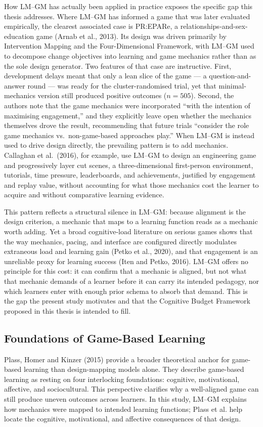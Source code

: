\documentclass[12pt]{report}
\begin{document}
How LM--GM has actually been applied in practice exposes the specific gap this thesis addresses. Where LM--GM has informed a game that was later evaluated empirically, the clearest associated case is PR:EPARe, a relationships-and-sex-education game (Arnab et al., 2013). Its design was driven primarily by Intervention Mapping and the Four-Dimensional Framework, with LM--GM used to decompose change objectives into learning and game mechanics rather than as the sole design generator. Two features of that case are instructive. First, development delays meant that only a lean slice of the game --- a question-and-answer round --- was ready for the cluster-randomised trial, yet that minimal-mechanics version still produced positive outcomes ($n = 505$). Second, the authors note that the game mechanics were incorporated ``with the intention of maximising engagement,'' and they explicitly leave open whether the mechanics themselves drove the result, recommending that future trials ``consider the role game mechanics vs.\ non-game-based approaches play.'' When LM--GM is instead used to drive design directly, the prevailing pattern is to add mechanics. Callaghan et al.\ (2016), for example, use LM--GM to design an engineering game and progressively layer cut scenes, a three-dimensional first-person environment, tutorials, time pressure, leaderboards, and achievements, justified by engagement and replay value, without accounting for what those mechanics cost the learner to acquire and without comparative learning evidence.

This pattern reflects a structural silence in LM--GM: because alignment is the design criterion, a mechanic that maps to a learning function reads as a mechanic worth adding. Yet a broad cognitive-load literature on serious games shows that the way mechanics, pacing, and interface are configured directly modulates extraneous load and learning gain (Petko et al., 2020), and that engagement is an unreliable proxy for learning success (Iten and Petko, 2016). LM--GM offers no principle for this cost: it can confirm that a mechanic is aligned, but not what that mechanic demands of a learner before it can carry its intended pedagogy, nor which learners enter with enough prior schema to absorb that demand. This is the gap the present study motivates and that the Cognitive Budget Framework proposed in this thesis is intended to fill.

\subsection{Foundations of Game-Based Learning}
Plass, Homer and Kinzer (2015) provide a broader theoretical anchor for game-based learning than design-mapping models alone. They describe game-based learning as resting on four interlocking foundations: cognitive, motivational, affective, and sociocultural. This perspective clarifies why a well-aligned game can still produce uneven outcomes across learners. In this study, LM--GM explains how mechanics were mapped to intended learning functions; Plass et al. help locate the cognitive, motivational, and affective consequences of that design.
\end{document}
